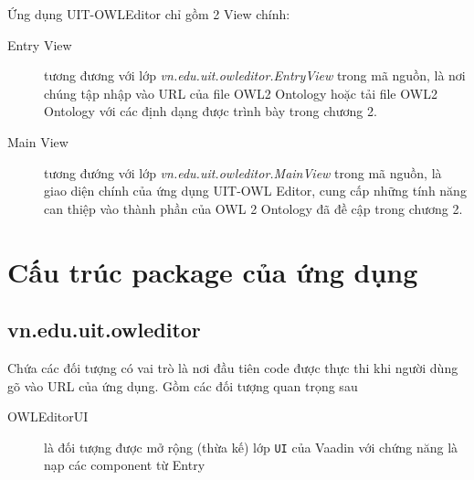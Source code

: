 Ứng dụng UIT-OWLEditor chỉ gồm 2 View chính:
\begin{description}
\item[Entry View] tương đương với lớp \textit{vn.edu.uit.owleditor.EntryView} trong mã nguồn, là nơi chúng tập nhập vào URL của file OWL2 Ontology hoặc tải file OWL2 Ontology với các định dạng được trình bày trong chương 2.
\item[Main View] tương đướng với lớp \textit{vn.edu.uit.owleditor.MainView} trong mã nguồn,
là giao diện chính của ứng dụng UIT-OWL Editor, cung cấp những tính năng can thiệp vào thành phần của OWL 2 Ontology đã đề cập trong chương 2.
\end{description}

\section{Cấu trúc package của ứng dụng}
\subsection{vn.edu.uit.owleditor}
Chứa các đối tượng có vai trò là nơi đầu tiên code được thực thi khi người dùng gõ vào URL của ứng dụng. Gồm các đối tượng quan trọng sau
\begin{description}
\item[OWLEditorUI] là đối tượng được mở rộng (thừa kế) lớp \verb|UI| của Vaadin với chứng năng là nạp các component từ Entry 
\end{description}